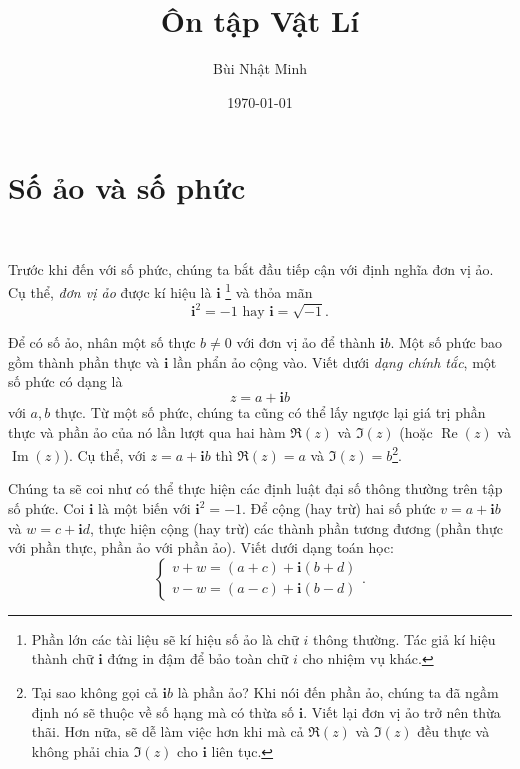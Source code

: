 \documentclass[a4paper, titlepage, openany]{book}
\title{\Huge Ôn tập Vật Lí}
\author{Bùi Nhật Minh}
\date{\today}
\newcommand{\chapdir}{chapter/}
\numberwithin{equation}{chapter}
\begin{document}
\setcounter{chapter}{-1}

\maketitle

\tableofcontents





\section{Số ảo và số phức}

\ %

Trước khi đến với số phức, chúng ta bắt đầu tiếp cận với định nghĩa đơn vị ảo. Cụ thể, \emph{đơn vị ảo} được kí hiệu là $\mathbf{i}$ \footnote{Phần lớn các tài liệu sẽ kí hiệu số ảo là chữ $i$ thông thường. Tác giả kí hiệu thành chữ $\mathbf{i}$ đứng in đậm để bảo toàn chữ $i$ cho nhiệm vụ khác.} và thỏa mãn $$\mathbf{i}^2 = -1 \text{ hay } \mathbf{i} = \sqrt{-1}.$$

Để có số ảo, nhân một số thực $b \neq 0$ với đơn vị ảo để thành $\mathbf{i}b$. Một số phức bao gồm thành phần thực và $\mathbf{i}$ lần phẩn ảo cộng vào. Viết dưới \emph{dạng chính tắc}, một số phức có dạng là $$z=a+\mathbf{i}b$$ với $a, b$ thực. Từ một số phức, chúng ta cũng có thể lấy ngược lại giá trị phần thực và phần ảo của nó lần lượt qua hai hàm $\Re{(z)}$ và $\Im{(z)}$ (hoặc $\operatorname*{Re}{(z)}$ và $\operatorname*{Im}{(z)}$). Cụ thể, với $z=a+\mathbf{i}b$ thì $\Re{(z)} = a$ và $\Im{(z)}=b$\footnote{Tại sao không gọi cả $\mathbf{i}b$ là phần ảo? Khi nói đến phần ảo, chúng ta đã ngầm định nó sẽ thuộc về số hạng mà có thừa số $\mathbf{i}$. Viết lại đơn vị ảo trở nên thừa thãi. Hơn nữa, sẽ dễ làm việc hơn khi mà cả $\Re{(z)}$ và $\Im{(z)}$ đều thực và không phải chia $\Im{(z)}$ cho $\mathbf{i}$ liên tục.}.

Chúng ta sẽ coi như có thể thực hiện các định luật đại số thông thường trên tập số phức. Coi $\mathbf{i}$ là một biến với $\mathbf{i}^2 = -1$. Để cộng (hay trừ) hai số phức $v = a + \mathbf{i}b$ và $w = c + \mathbf{i}d$, thực hiện cộng (hay trừ) các thành phần tương đương (phần thực với phần thực, phần ảo với phần ảo). Viết dưới dạng toán học:
\begin{equation*}
   \begin{cases}
      v + w = (a + c) + \mathbf{i}(b + d) \\ 
      v - w = (a - c) + \mathbf{i}(b - d) 
   \end{cases}.
\end{equation*}
\end{document}
